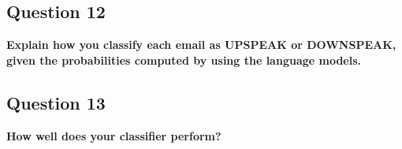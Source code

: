 \documentclass{article} %
\begin{document}

\lipsum[2] %

\subsection*{Question 12}

\textbf{Explain how you classify each email as UPSPEAK or DOWNSPEAK, given the probabilities computed by using the language models.}


\lipsum[2]

\subsection*{Question 13}

\textbf{How well does your classifier perform?}


\lipsum[2]
\end{document}
